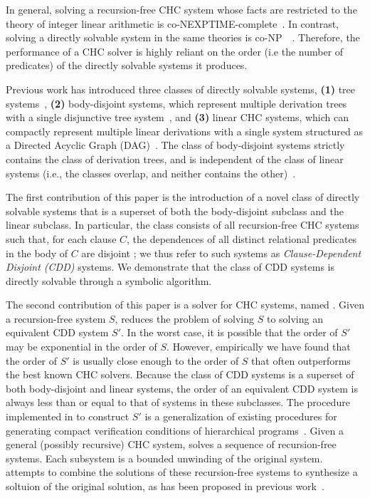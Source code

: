 In general, solving a recursion-free CHC system whose facts are
restricted to the theory of integer linear arithmetic is
co-NEXPTIME-complete~\cite{rummer13b}.
%
In contrast, solving a directly solvable system in the same theories
is co-NP~~\cite{rummer13b}.
%
Therefore, the performance of a CHC solver is highly reliant on the
order (i.e the number of predicates) of the directly solvable systems
it produces.

Previous work has introduced three classes of directly solvable
systems,
\textbf{(1)} tree systems~\cite{heizmann10,bjorner13,mcmillan14}, %
\textbf{(2)} body-disjoint systems, which represent multiple
derivation trees with a single disjunctive tree
system~\cite{rummer13a,rummer13b}, and
\textbf{(3)} linear CHC systems, which can compactly represent
multiple linear derivations with a single system structured as a
Directed Acyclic Graph (DAG)~\cite{albarghouthi12a}.
%
The class of body-disjoint systems strictly contains the class of
derivation trees, and is independent of the class of linear systems
(i.e., the classes overlap, and neither contains the
other)~\cite{rummer13a,rummer13b}.

The first contribution of this paper is the introduction of a novel
class of directly solvable systems that is a superset of both
the body-disjoint subclass and the linear subclass.
%
In particular, the class consists of all recursion-free CHC systems
such that, for each clause $C$, the dependences of all distinct
relational predicates in the body of $C$ are disjoint ;
%
we thus refer to such systems as \emph{Clause-Dependent Disjoint
(CDD)} systems.
%
We demonstrate that the class of CDD systems is directly solvable
through a symbolic algorithm.
%

The second contribution of this paper is a solver for CHC systems,
named \sys.
%
Given a recursion-free system $S$, \sys reduces the problem
of solving $S$ to solving an equivalent CDD system
$S'$.
%
In the worst case, it is possible that the order of $S'$ may be
exponential in the order of $S$.
%
However, empirically we have found that the order of $S'$ is usually
close enough to the order of $S$ that \sys often outperforms the best
known CHC solvers.
%
Because the class of CDD systems is a superset of both body-disjoint
and linear systems, the order of an equivalent CDD system is always
less than or equal to that of systems in these subclasses.
%
The procedure implemented in \sys to construct $S'$ is a
generalization of existing procedures for generating compact
verification conditions of hierarchical
programs~\cite{flanagan01,lal-qadeer15}.
%
Given a general (possibly recursive) CHC system, \sys solves a sequence of
recursion-free systems.
%
Each subsystem is a bounded unwinding of the original system. \sys
attempts to combine the solutions of these recursion-free systems to
synthesize a soltuion of the original solution, as has been proposed
in previous work~\cite{rummer13b}.

